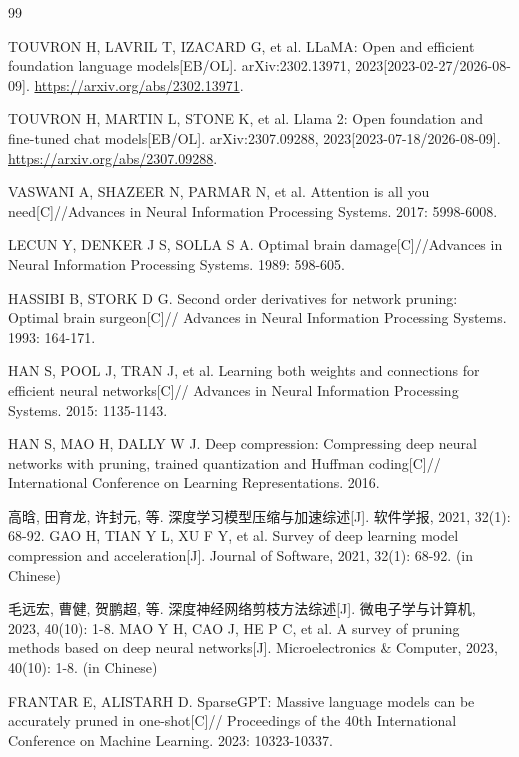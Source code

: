 \begin{thebibliography}{99}
\footnotesize
\setlength{\itemsep}{-3pt}
\setlength{\parsep}{0pt}

TOUVRON H, LAVRIL T, IZACARD G, et al.
LLaMA: Open and efficient foundation language models[EB/OL].
arXiv:2302.13971, 2023[2023-02-27/2026-08-09].
\url{https://arxiv.org/abs/2302.13971}.

TOUVRON H, MARTIN L, STONE K, et al.
Llama 2: Open foundation and fine-tuned chat models[EB/OL].
arXiv:2307.09288, 2023[2023-07-18/2026-08-09].
\url{https://arxiv.org/abs/2307.09288}.

VASWANI A, SHAZEER N, PARMAR N, et al.
Attention is all you need[C]//Advances in Neural Information Processing Systems.
2017: 5998-6008.

LECUN Y, DENKER J S, SOLLA S A.
Optimal brain damage[C]//Advances in Neural Information Processing Systems.
1989: 598-605.

HASSIBI B, STORK D G.
Second order derivatives for network pruning: Optimal brain surgeon[C]//
Advances in Neural Information Processing Systems.
1993: 164-171.

HAN S, POOL J, TRAN J, et al.
Learning both weights and connections for efficient neural networks[C]//
Advances in Neural Information Processing Systems.
2015: 1135-1143.

HAN S, MAO H, DALLY W J.
Deep compression: Compressing deep neural networks with pruning, trained quantization and Huffman coding[C]//
International Conference on Learning Representations.
2016.

高晗, 田育龙, 许封元, 等.
深度学习模型压缩与加速综述[J].
软件学报, 2021, 32(1): 68-92.
GAO H, TIAN Y L, XU F Y, et al. Survey of deep learning model compression and acceleration[J].
Journal of Software, 2021, 32(1): 68-92. (in Chinese)

毛远宏, 曹健, 贺鹏超, 等.
深度神经网络剪枝方法综述[J].
微电子学与计算机, 2023, 40(10): 1-8.
MAO Y H, CAO J, HE P C, et al. A survey of pruning methods based on deep neural networks[J].
Microelectronics \& Computer, 2023, 40(10): 1-8. (in Chinese)

FRANTAR E, ALISTARH D.
SparseGPT: Massive language models can be accurately pruned in one-shot[C]//
Proceedings of the 40th International Conference on Machine Learning.
2023: 10323-10337.


\end{thebibliography}
